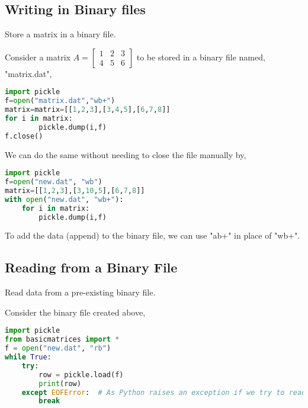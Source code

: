 \subsection{Writing in Binary files}
\begin{eg}
	Store a matrix in a binary file.
\end{eg}
\begin{explanation}
	Consider a matrix $A=\begin{bmatrix}
			1 & 2 & 3 \\
			4 & 5 & 6
		\end{bmatrix}$ to be stored in a binary file named, "matrix.dat",
	\begin{lstlisting}[language=Python]
import pickle
f=open("matrix.dat","wb+")
matrix=matrix=[[1,2,3],[3,4,5],[6,7,8]]
for i in matrix:
		pickle.dump(i,f)
f.close() \end{lstlisting}

We can do the same without needing to close the file manually by,
\begin{lstlisting}[language=Python]
import pickle
f=open("new.dat", "wb")
matrix=[[1,2,3],[3,10,5],[6,7,8]]
with open("new.dat", "wb+"):
    for i in matrix:
        pickle.dump(i,f)\end{lstlisting}
To add the data (append) to the binary file, we can use "ab+" in place of "wb+".
\end{explanation}
\subsection{Reading from a Binary File}
\begin{eg}
	Read data from a pre-existing binary file.
\end{eg}
\begin{explanation}
	Consider the binary file created above,
	\begin{lstlisting}[language=Python]
import pickle
from basicmatrices import *
f = open("new.dat", "rb")
while True:
    try:
        row = pickle.load(f)
        print(row)
    except EOFError:  # As Python raises an exception if we try to read after the file is over
        break \end{lstlisting}
\end{explanation}
